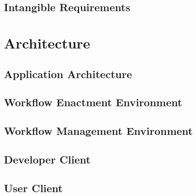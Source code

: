\documentclass[language=english,noinputenc]{wiwwuwordrprt}
\begin{document}
      \subsection{Intangible Requirements} %
      \label{sub:intangible_requirements}
      
    
    
    \section{Architecture} %
    \label{sec:architecture}
      \subsection{Application Architecture} %
      \label{sub:application_architecture}
      
      \subsection{Workflow Enactment Environment} %
      \label{sub:workflow_enactment_component}
      
      \subsection{Workflow Management Environment} %
      \label{sub:workflow_management}
      
      \subsection{Developer Client} %
      \label{sub:developer_client}
      

      \subsection{User Client} %
      \label{sub:user_client}
      
    
  
\end{document}
